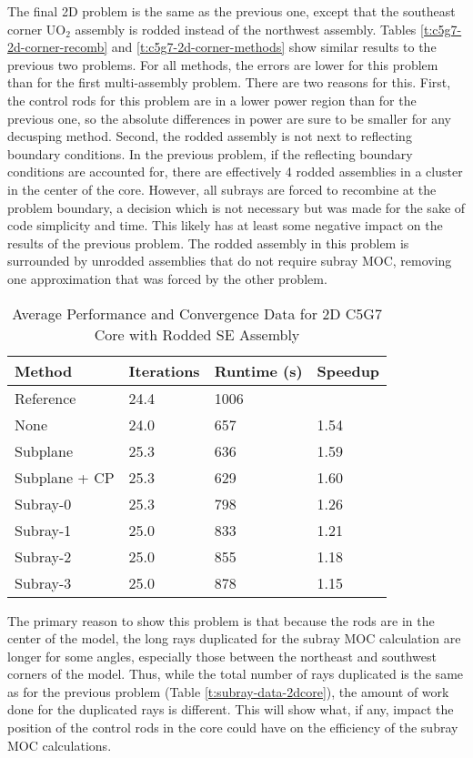The final 2D problem is the same as the previous one, except that the southeast corner UO$_2$ assembly is rodded instead of the northwest assembly.  Tables \ref{t:c5g7-2d-corner-recomb} and \ref{t:c5g7-2d-corner-methods} show similar results to the previous two problems.  For all methods, the errors are lower for this problem than for the first multi-assembly problem.  There are two reasons for this.  First, the control rods for this problem are in a lower power region than for the previous one, so the absolute differences in power are sure to be smaller for any decusping method.  Second, the rodded assembly is not next to reflecting boundary conditions.  In the previous problem, if the reflecting boundary conditions are accounted for, there are effectively 4 rodded assemblies in a cluster in the center of the core.  However, all subrays are forced to recombine at the problem boundary, a decision which is not necessary but was made for the sake of code simplicity and time.  This likely has at least some negative impact on the results of the previous problem.  The rodded assembly in this problem is surrounded by unrodded assemblies that do not require subray MOC, removing one approximation that was forced by the other problem.

\begin{table}[h]
    \centering
    \caption{Average Performance and Convergence Data for 2D C5G7 Core with Rodded SE Assembly}\label{t:subray-performance-2dcoreSE}
    \begin{tabular}{l l l l}\toprule
        Method & Iterations & Runtime (s) & Speedup \\\midrule
Reference     & 24.4 & 1006 &     \\
None          & 24.0 & 657 & 1.54 \\
Subplane      & 25.3 & 636 & 1.59 \\
Subplane + CP & 25.3 & 629 & 1.60 \\
Subray-0      & 25.3 & 798 & 1.26 \\
Subray-1      & 25.0 & 833 & 1.21 \\
Subray-2      & 25.0 & 855 & 1.18 \\
Subray-3      & 25.0 & 878 & 1.15 \\
        \bottomrule
    \end{tabular}
\end{table}

The primary reason to show this problem is that because the rods are in the center of the model, the long rays duplicated for the subray MOC calculation are longer for some angles, especially those between the northeast and southwest corners of the model.  Thus, while the total number of rays duplicated is the same as for the previous problem (Table \ref{t:subray-data-2dcore}), the amount of work done for the duplicated rays is different.  This will show what, if any, impact the position of the control rods in the core could have on the efficiency of the subray MOC calculations.

